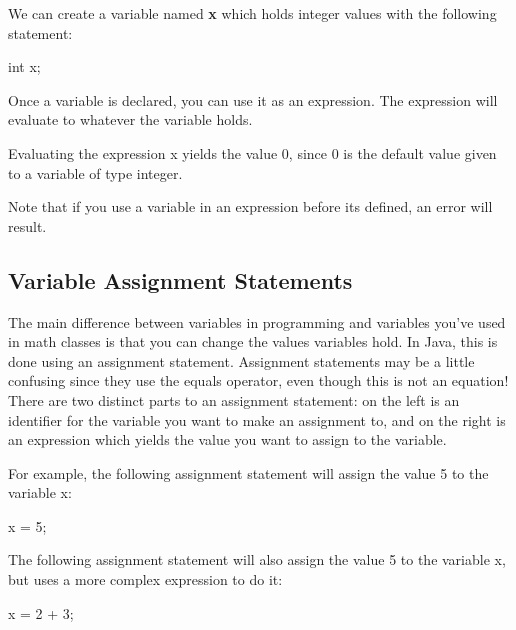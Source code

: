 \begin{exa}
We can create a variable named \textbf{x} which holds integer values with the following statement:

\begin{code}
int x;
\end{code}
\end{exa}

Once a variable is declared, you can use it as an expression. The expression will 
evaluate to whatever the variable holds. 

\begin{exa}
Evaluating the expression x yields the value 0, since 0 is the default value 
given to a variable of type integer.
\end{exa}

Note that if you use a variable in an expression before its defined, an error will result.

\subsection{Variable Assignment Statements}

The main difference between variables in programming and variables you've used in math classes is that you can change the values variables hold. In Java, this is done 
using an assignment statement. Assignment statements may be a little confusing
since they use the equals operator, even though this is not an equation! There 
are two distinct parts to an assignment statement: on the left is an identifier for 
the variable you want to make an assignment to, and on the right is an expression 
which yields the value you want to assign to the variable. 

\begin{exa}
For example, the following assignment statement will assign the value 5 to the variable
x:

\begin{code}
x = 5;
\end{code}
\end{exa}

\begin{exa}
The following assignment statement will also assign the value 5 to the variable
x, but uses a more complex expression to do it:

\begin{code}
x = 2 + 3;
\end{code}
\end{exa}

